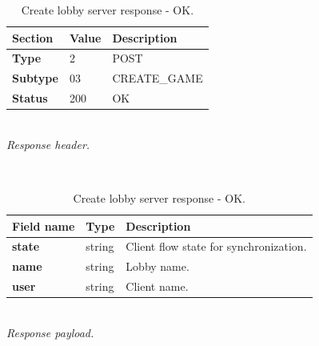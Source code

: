 \documentclass[english, sem, kiv, he, iso690alph, pdf, viewonly]{fasthesis}
\begin{document}
\begin{table}[h!]
	\centering
	\begin{minipage}[b]{1.0\textwidth}
		\centering
		\begin{tabular}{|l|l|l|}
			\hline
			\textbf{Section} & \textbf{Value} & \textbf{Description} \\ \hline
			\textbf{Type} & 2 & \footnotesize{POST} \\ \hline
			\textbf{Subtype} & 03 & \footnotesize{CREATE\_GAME}  \\ \hline
			\textbf{Status} & 200 & \footnotesize{OK} \\ \hline
		\end{tabular} \\
		\textit{Response header.}
	\end{minipage} 
	\\
	\vspace{10pt}
	\begin{minipage}[b]{1.0\textwidth}
		\centering
		\begin{tabular}{|l|l|l|}
			\hline
			\textbf{Field name} & \textbf{Type} & \textbf{Description} \\ \hline
			\textbf{state} & string & Client flow state for synchronization. \\ \hline
			\textbf{name} & string & Lobby name. \\ \hline
			\textbf{user} & string & Client name. \\ \hline
		\end{tabular} \\
		\textit{Response payload.}
	\end{minipage}	
	\caption{Create lobby server response - OK.}
	\label{tab:create_lobby_response_OK}
\end{table}
\end{document}
